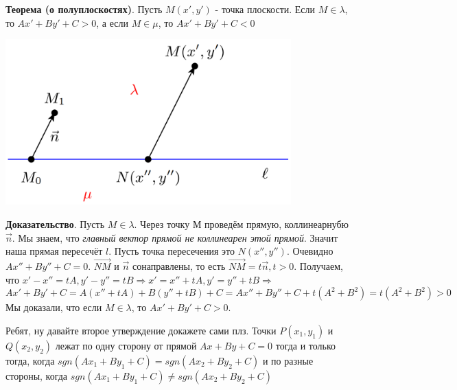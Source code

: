 \documentclass[a4paper]{article}
\begin{document}
\begin{htheorem}
\textbf{Теорема (о полуплоскостях)}. Пусть $M(x', y')$ - точка плоскости. Если $M \in \lambda$, то $Ax' + By' + C > 0$, а если $M \in \mu $, то $Ax' + By' + C < 0$ 
\end{htheorem}



\includegraphics[width=11cm]{t7}

\begin{hproof}
\textbf{Доказательство}. Пусть $M \in \lambda$. Через точку М проведём прямую, коллинеарнубю $\vec{n}$. Мы знаем, что \textit{главный вектор прямой не коллинеарен этой прямой}. Значит наша прямая пересечёт $l$. Пусть точка пересечения это $N(x'', y'')$. Очевидно $Ax'' + By'' + C = 0$. $\overrightarrow{NM}$ и $\vec{n}$ сонаправлены, то есть $\overrightarrow{NM} = t \vec{n}, t>0$. Получаем, что $x' -x'' = tA, y'-y'' = tB \Rightarrow x' = x'' + tA, y' = y'' + tB \Rightarrow$ \newline \begin{equation}
Ax' + By' + C = A(x'' + tA) + B(y'' + tB) + C = Ax'' + By'' + C + t(A^2 + B^2) = t(A^2+B^2)>0
\end{equation}
Мы доказали, что если $M \in \lambda$, то $Ax' + By' + C > 0$. 

Ребят, ну давайте второе утверждение докажете сами плз.
\newline
Точки $P(x_1, y_1)$ и $Q(x_2, y_2)$ лежат по одну сторону от прямой $Ax+By+C=0$ тогда и только тогда, когда $sgn (Ax_1+By_1+C) = sgn (Ax_2+By_2+C)$ и по разные стороны, когда $sgn (Ax_1+By_1+C) \neq sgn (Ax_2+By_2+C)$
\end{hproof}

\newpage \begin{center}\begin{Large}\end{Large}\end{center}
\end{document}
